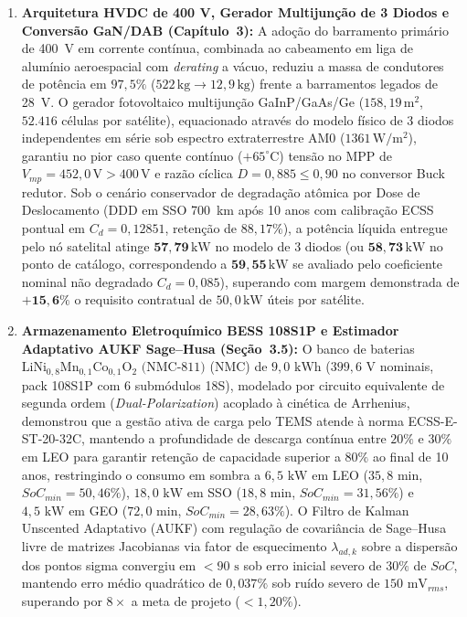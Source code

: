\begin{enumerate}[label=\textbf{\arabic*.},leftmargin=*]
    \item \textbf{Arquitetura HVDC de 400 V, Gerador Multijunção de 3 Diodos e Conversão GaN/DAB (Capítulo~3):} A adoção do barramento primário de 400~V em corrente contínua, combinada ao cabeamento em liga de alumínio aeroespacial com \textit{derating} a vácuo, reduziu a massa de condutores de potência em $97{,}5\%$ ($522\,\mathrm{kg} \rightarrow 12{,}9\,\mathrm{kg}$) frente a barramentos legados de 28~V. O gerador fotovoltaico multijunção GaInP/GaAs/Ge ($158{,}19\,\mathrm{m^2}$, $52.416$ células por satélite), equacionado através do modelo físico de 3 diodos independentes em série sob espectro extraterrestre AM0 ($1361\,\mathrm{W/m^2}$), garantiu no pior caso quente contínuo ($+65^\circ\text{C}$) tensão no MPP de $V_{mp} = 452{,}0\,\mathrm{V} > 400\,\mathrm{V}$ e razão cíclica $D = 0{,}885 \le 0{,}90$ no conversor Buck redutor. Sob o cenário conservador de degradação atômica por Dose de Deslocamento (DDD em SSO 700~km após 10 anos com calibração ECSS pontual em $C_d = 0{,}12851$, retenção de $88{,}17\%$), a potência líquida entregue pelo nó satelital atinge $\mathbf{57{,}79\,\mathrm{kW}}$ no modelo de 3 diodos (ou $\mathbf{58{,}73\,\mathrm{kW}}$ no ponto de catálogo, correspondendo a $\mathbf{59{,}55\,\mathrm{kW}}$ se avaliado pelo coeficiente nominal não degradado $C_d = 0{,}085$), superando com margem demonstrada de $+\mathbf{15{,}6\%}$ o requisito contratual de $50{,}0\,\mathrm{kW}$ úteis por satélite.
    \item \textbf{Armazenamento Eletroquímico BESS 108S1P e Estimador Adaptativo AUKF Sage--Husa (Seção~3.5):} O banco de baterias $\text{LiNi}_{0{,}8}\text{Mn}_{0{,}1}\text{Co}_{0{,}1}\text{O}_2\text{ (NMC-811)}$ (NMC) de $9{,}0\text{ kWh}$ ($399{,}6\text{ V}$ nominais, pack 108S1P com 6 submódulos 18S), modelado por circuito equivalente de segunda ordem (\textit{Dual-Polarization}) acoplado à cinética de Arrhenius, demonstrou que a gestão ativa de carga pelo TEMS atende à norma ECSS-E-ST-20-32C, mantendo a profundidade de descarga contínua entre $20\%\text{ e }30\%$ em LEO para garantir retenção de capacidade superior a $80\%$ ao final de 10 anos, restringindo o consumo em sombra a $6{,}5\text{ kW}$ em LEO ($35{,}8\text{ min}$, $SoC_{min} = 50{,}46\%$), $18{,}0\text{ kW}$ em SSO ($18{,}8\text{ min}$, $SoC_{min} = 31{,}56\%$) e $4{,}5\text{ kW}$ em GEO ($72{,}0\text{ min}$, $SoC_{min} = 28{,}63\%$). O Filtro de Kalman Unscented Adaptativo (AUKF) com regulação de covariância de Sage--Husa livre de matrizes Jacobianas via fator de esquecimento $\lambda_{ad,k}$ sobre a dispersão dos pontos sigma convergiu em $< 90\text{ s}$ sob erro inicial severo de $30\%$ de $SoC$, mantendo erro médio quadrático de $0{,}037\%$ sob ruído severo de $150\text{ mV}_{rms}$, superando por $8\times$ a meta de projeto ($< 1{,}20\%$).

\end{enumerate}
